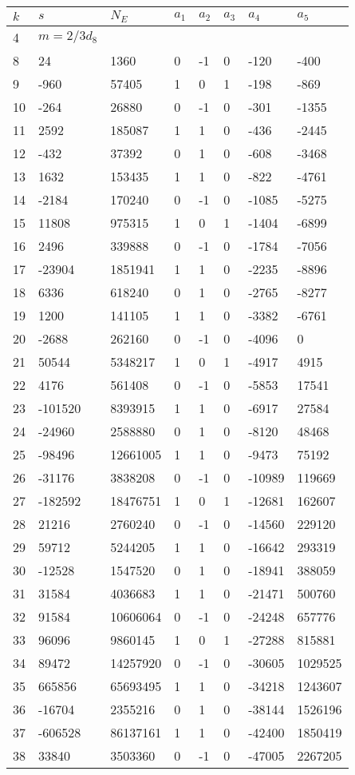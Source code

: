 \documentclass{amsart}
\begin{document}
\begin{longtable}{|l|l|l|lllll|}
\hline
$k$ & $s$ & $N_E$ & $a_1$ & $a_2$ & $a_3$ & $a_4$ & $a_5$\\
\hline
4&$m=2/3d_{8}$&&\multicolumn{5}{c|}{}\\
8&24&1360&0&-1&0&-120&-400\\
9&-960&57405&1&0&1&-198&-869\\
10&-264&26880&0&-1&0&-301&-1355\\
11&2592&185087&1&1&0&-436&-2445\\
12&-432&37392&0&1&0&-608&-3468\\
13&1632&153435&1&1&0&-822&-4761\\
14&-2184&170240&0&-1&0&-1085&-5275\\
15&11808&975315&1&0&1&-1404&-6899\\
16&2496&339888&0&-1&0&-1784&-7056\\
17&-23904&1851941&1&1&0&-2235&-8896\\
18&6336&618240&0&1&0&-2765&-8277\\
19&1200&141105&1&1&0&-3382&-6761\\
20&-2688&262160&0&-1&0&-4096&0\\
21&50544&5348217&1&0&1&-4917&4915\\
22&4176&561408&0&-1&0&-5853&17541\\
23&-101520&8393915&1&1&0&-6917&27584\\
24&-24960&2588880&0&1&0&-8120&48468\\
25&-98496&12661005&1&1&0&-9473&75192\\
26&-31176&3838208&0&-1&0&-10989&119669\\
27&-182592&18476751&1&0&1&-12681&162607\\
28&21216&2760240&0&-1&0&-14560&229120\\
29&59712&5244205&1&1&0&-16642&293319\\
30&-12528&1547520&0&1&0&-18941&388059\\
31&31584&4036683&1&1&0&-21471&500760\\
32&91584&10606064&0&-1&0&-24248&657776\\
33&96096&9860145&1&0&1&-27288&815881\\
34&89472&14257920&0&-1&0&-30605&1029525\\
35&665856&65693495&1&1&0&-34218&1243607\\
36&-16704&2355216&0&1&0&-38144&1526196\\
37&-606528&86137161&1&1&0&-42400&1850419\\
38&33840&3503360&0&-1&0&-47005&2267205\\

\end{longtable}
\end{document}
